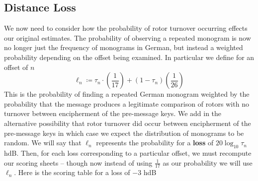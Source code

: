   \subsection{Distance Loss}
  We now need to consider how the probability of rotor turnover
  occurring effects our original estimates. The probability of
  observing a repeated monogram is now no longer just the frequency
  of monograms in German, but instead a weighted probability
  depending on the offset being examined. In particular we define for
  an offset of $n$
  \[
    \ell_n \coloneq \tau_n\cdot(\frac{1}{17}) + (1-\tau_n)(\frac{1}{26})
  \]
  This is the probability of finding a repeated German monogram
  weighted by the probability that the message produces a legitimate
  comparison of rotors with no turnover between encipherment of the
  pre-message keys. We add in the alternative possibility that rotor
  turnover did occur between encipherment of the pre-message keys in
  which case we expect the distribution of monograms to be random. We
  will say that $\ell_n$ represents the probability for a {\bf{loss}}
  of $20\log_{10}{\tau_n}$ hdB. Then, for each loss corresponding to
  a particular offset, we must recompute our scoring sheets -- though
  now instead of using $\frac{1}{17}$ as our probability we will use
  $\ell_n$. Here is the scoring table for a loss of $-3$ hdB
